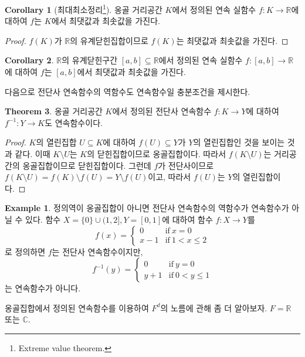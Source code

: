 \documentclass[11pt]{book}
\numberwithin{equation}{chapter}
\def\RR{\mathbb{R}}
\def\CC{\mathbb{C}}
\def\textif{\text{if}}
\theoremstyle{definition}
\newtheorem{thm}{Theorem}[section]
\newtheorem{cor}[thm]{Corollary}
\newtheorem*{ex}{Example}
\begin{document}
\begin{cor}[최대최소정리\footnote{Extreme value theorem.}]
    옹골 거리공간 \(K\)에서 정의된 연속 실함수 \(f : K \to \RR\)에 대하여 \(f\)는 \(K\)에서 최댓값과 최솟값을 가진다.
\end{cor}
\begin{proof}
    \(f(K)\)가 \(\RR\)의 유계닫힌집합이므로 \(f(K)\)는 최댓값과 최솟값을 가진다.
\end{proof}
\begin{cor}
    \(\RR\)의 유계닫힌구간 \([a, b] \subseteq \RR\)에서 정의된 연속 실함수 \(f : [a, b] \to \RR\)에 대하여 \(f\)는 \([a, b]\)에서 최댓값과 최솟값을 가진다.
\end{cor}

다음으로 전단사 연속함수의 역함수도 연속함수일 충분조건을 제시한다.

\begin{thm}
    옹골 거리공간 \(K\)에서 정의된 전단사 연속함수 \(f : K \to Y\)에 대하여 \(f^{-1} : Y \to K\)도 연속함수이다.
\end{thm}
\begin{proof}
    \(K\)의 열린집합 \(U \subseteq K\)에 대하여 \(f(U) \subseteq Y\)가 \(Y\)의 열린집합인 것을 보이는 것과 같다. 이때 \(K \setminus U\)는 \(K\)의 닫힌집합이므로 옹골집합이다. 따라서 \(f(K \setminus U)\)는 거리공간의 옹골집합이므로 닫힌집합이다. 그런데 \(f\)가 전단사이므로 \(f(K \setminus U) = f(K) \setminus f(U) = Y \setminus f(U)\)이고, 따라서 \(f(U)\)는 \(Y\)의 열린집합이다.
\end{proof}

\begin{ex}
    정의역이 옹골집합이 아니면 전단사 연속함수의 역함수가 연속함수가 아닐 수 있다. 함수 \(X = \{0\} \cup (1, 2], Y = [0, 1]\)에 대하여 함수 \(f : X \to Y\)를
    \[
        f(x) =
        \begin{cases}
            0 &\textif \ x = 0\\
            x-1 &\textif \ 1 < x \le 2
        \end{cases}
    \]
    로 정의하면 \(f\)는 전단사 연속함수이지만,
    \[
    f^{-1}(y) =
    \begin{cases}
        0 &\textif \ y = 0\\
        y+1 &\textif \ 0 < y \le 1
    \end{cases}    
    \]
    는 연속함수가 아니다.
\end{ex}

옹골집합에서 정의된 연속함수를 이용하여 \(F^d\)의 노름에 관해 좀 더 알아보자. \(F = \RR\) 또는 \(\CC\).
\end{document}
